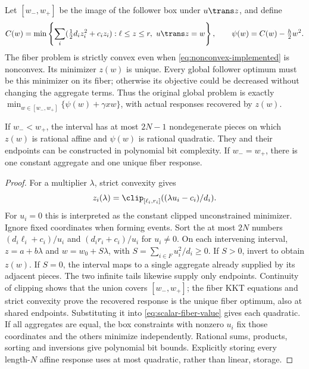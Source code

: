 Let $[w_-,w_+]$ be the image of the follower box under $u\trans z$, and define
\begin{equation}\label{eq:scalar-fiber-value}
 C(w)=\min\left\{\sum_i(\tfrac12d_i z_i^2+c_i z_i):
                  \ell\le z\le r,\ u\trans z=w\right\},
 \qquad \psi(w)=C(w)-\tfrac h2w^2.
\end{equation}
The fiber problem is strictly convex even when \eqref{eq:nonconvex-implemented}
is nonconvex. Its minimizer $z(w)$ is unique. Every global follower optimum
must be this minimizer on its fiber; otherwise its objective could be decreased
without changing the aggregate terms. Thus the original global problem is
exactly $\min_{w\in[w_-,w_+]}\{\psi(w)+\gamma xw\}$, with actual responses
recovered by $z(w)$.

\begin{lemma}\label{lem:scalar-fiber-pieces}
If $w_-<w_+$, the interval has at most $2N-1$ nondegenerate pieces on which
$z(w)$ is rational affine and $\psi(w)$ is rational quadratic. They and their
endpoints can be constructed in polynomial bit complexity. If $w_-=w_+$,
there is one constant aggregate and one unique fiber response.
\end{lemma}
\begin{proof}
For a multiplier $\lambda$, strict convexity gives
\[
 z_i(\lambda)=\clip_{[\ell_i,r_i]}((\lambda u_i-c_i)/d_i).
\]
For $u_i=0$ this is interpreted as the constant clipped unconstrained
minimizer. Ignore fixed coordinates when forming events. Sort the at most
$2N$ numbers $(d_i\ell_i+c_i)/u_i$ and $(d_ir_i+c_i)/u_i$ for $u_i\ne0$.
On each intervening interval, $z=a+b\lambda$ and
$w=w_0+S\lambda$, with $S=\sum_{i\in F}u_i^2/d_i\ge0$.
If $S>0$, invert to obtain $z(w)$. If $S=0$, the interval maps to a single
aggregate already supplied by its adjacent pieces. The two infinite tails
likewise supply only endpoints. Continuity of clipping shows that the union
covers $[w_-,w_+]$; the fiber KKT equations and strict convexity prove the
recovered response is the unique fiber optimum, also at shared endpoints.
Substituting it into \eqref{eq:scalar-fiber-value} gives each quadratic.
If all aggregates are equal, the box constraints with nonzero $u_i$ fix those
coordinates and the others minimize independently. Rational sums, products,
sorting and inversions give polynomial bit bounds. Explicitly storing every
length-$N$ affine response uses at most quadratic, rather than linear, storage.
\end{proof}

